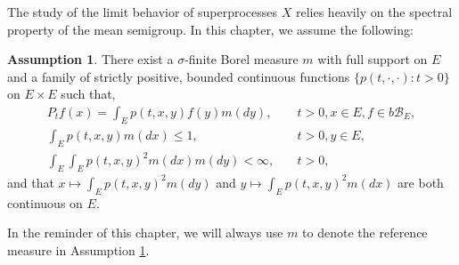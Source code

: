 \documentclass[UTF8]{pkuthss}
\theoremstyle{plain}
\theoremstyle{definition}
\newtheorem{asp}{Assumption}[chapter]
\numberwithin{equation}{section}
\begin{document}
	The study of the limit behavior of superprocesses $X$
		relies heavily on the spectral property of the mean semigroup.
 In this chapter, we assume the following:
\begin{asp}\label{asp:2}
	There exist a $\sigma$-finite Borel measure $m$ with full support on $E$ and a family of strictly positive, bounded continuous functions $\{ p(t,\cdot,\cdot): t > 0 \}$ on $E \times E$ such that,
\begin{align}
	P_t f(x)
	= \int_E p(t,x,y) f(y) m(dy),
	&\quad t>0, x \in E,f \in b\mathscr B_E,\label{eq:kernMeanSemGroup}
	\\ \int_E p(t,x,y)m(dx)
	\leq 1,
	&\quad t>0,y\in E,\label{eq:kernMeanSemGroup2}
	\\ \int_E \int_E p(t,x,y)^2 m(dx) m(dy)
	<\infty,
	&\quad t> 0,\label{eq:kernMeanSemGroup3}
\end{align}
	and that $x \mapsto \int_E p(t,x,y)^2 m(dy)$ and $y \mapsto \int_E p(t,x,y)^2 m(dx)$ are both continuous on $E$.
\end{asp}

	In the reminder of this chapter, we will always use $m$ to denote the reference measure in Assumption \ref{asp:2}.
\end{document}
